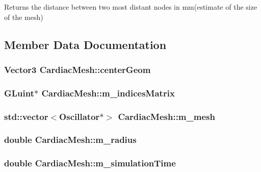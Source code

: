 Returns the distance between two most distant nodes in mm(estimate of the size of the mesh) 



\subsection{Member Data Documentation}
\hypertarget{class_cardiac_mesh_a671a783c6a63a79cc29e0b0baf8eda08}{
\subsubsection[{center\+Geom}]{\setlength{\rightskip}{0pt plus 5cm}Vector3 Cardiac\+Mesh\+::center\+Geom}}\label{class_cardiac_mesh_a671a783c6a63a79cc29e0b0baf8eda08}
\hypertarget{class_cardiac_mesh_a38f8cd7d06495c84b553eba41c9cb6be}{
\subsubsection[{m\+\_\+indices\+Matrix}]{\setlength{\rightskip}{0pt plus 5cm}G\+Luint$\ast$ Cardiac\+Mesh\+::m\+\_\+indices\+Matrix}}\label{class_cardiac_mesh_a38f8cd7d06495c84b553eba41c9cb6be}
\hypertarget{class_cardiac_mesh_acd49de8f8f878f45c927d4b75851ced6}{
\subsubsection[{m\+\_\+mesh}]{\setlength{\rightskip}{0pt plus 5cm}std\+::vector$<${\bf Oscillator}$\ast$$>$ Cardiac\+Mesh\+::m\+\_\+mesh}}\label{class_cardiac_mesh_acd49de8f8f878f45c927d4b75851ced6}
\hypertarget{class_cardiac_mesh_a4ebcb3d40ec7fbfea0b8f230a1677a00}{
\subsubsection[{m\+\_\+radius}]{\setlength{\rightskip}{0pt plus 5cm}double Cardiac\+Mesh\+::m\+\_\+radius}}\label{class_cardiac_mesh_a4ebcb3d40ec7fbfea0b8f230a1677a00}
\hypertarget{class_cardiac_mesh_ad1bf6fc56cbc55f30f9a3855cdafc316}{
\subsubsection[{m\+\_\+simulation\+Time}]{\setlength{\rightskip}{0pt plus 5cm}double Cardiac\+Mesh\+::m\+\_\+simulation\+Time}}\label{class_cardiac_mesh_ad1bf6fc56cbc55f30f9a3855cdafc316}
